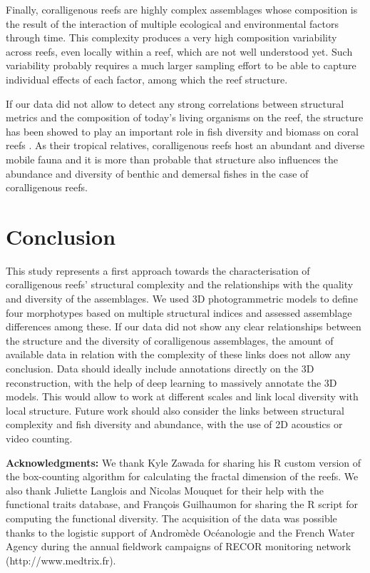 Finally, coralligenous reefs are highly complex assemblages whose composition is the result of the interaction of multiple ecological and environmental factors through time. This complexity produces a very high composition variability across reefs, even locally within a reef, which are not well understood yet. Such variability probably requires a much larger sampling effort to be able to capture individual effects of each factor, among which the reef structure. 

If our data did not allow to detect any strong correlations between structural metrics and the composition of today’s living organisms on the reef, the structure has been showed to play an important role in fish diversity and biomass on coral reefs \citep{darling_relationships_2017, graham_importance_2013, price_using_2019, willis_habitat_2005}. As their tropical relatives, coralligenous reefs host an abundant and diverse mobile fauna \citep{ballesteros_mediterranean_2006} and it is more than probable that structure also influences the abundance and diversity of benthic and demersal fishes in the case of coralligenous reefs.


\section{Conclusion}\label{chapitre4_5}
This study represents a first approach towards the characterisation of coralligenous reefs’ structural complexity and the relationships with the quality and diversity of the assemblages. We used 3D photogrammetric models to define four morphotypes based on multiple structural indices and assessed assemblage differences among these. If our data did not show any clear relationships between the structure and the diversity of coralligenous assemblages, the amount of available data in relation with the complexity of these links does not allow any conclusion. Data should ideally include annotations directly on the 3D reconstruction, with the help of deep learning to massively annotate the 3D models. This would allow to work at different scales and link local diversity with local structure. Future work should also consider the links between structural complexity and fish diversity and abundance, with the use of 2D acoustics or video counting.

\medskip

\noindent\textbf{Acknowledgments:} We thank Kyle Zawada for sharing his R custom version of the box-counting algorithm for calculating the fractal dimension of the reefs. We also thank Juliette Langlois and Nicolas Mouquet for their help with the functional traits database, and François Guilhaumon for sharing the R script for computing the functional diversity. The acquisition of the data was possible thanks to the logistic support of Andromède Océanologie and the French Water Agency during the annual fieldwork campaigns of RECOR monitoring network (http://www.medtrix.fr).